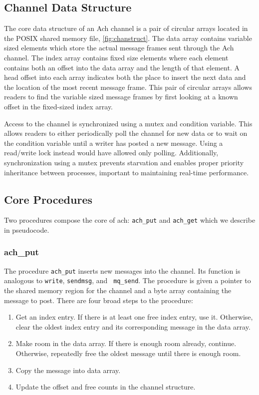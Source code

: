 \documentclass[letterpaper]{IEEEtran}
\begin{document}
\subsection{Channel Data Structure}

The core data structure of an Ach channel is a pair of circular arrays
located in the POSIX shared memory file, \autoref{fig:chanstruct}.  The
data array contains variable sized elements which store the actual
message frames sent through the Ach channel.  The index array contains
fixed size elements where each element contains both an offset into
the data array and the length of that element.  A head offset into
each array indicates both the place to insert the next data and the
location of the most recent message frame.  This pair of circular
arrays allows readers to find the variable sized message frames by
first looking at a known offset in the fixed-sized index array.

Access to the channel is synchronized using a mutex and condition
variable.  This allows readers to either periodically poll the channel
for new data or to wait on the condition variable until a writer has
posted a new message.  Using a read/write lock instead would have
allowed only polling.  Additionally, synchronization using a mutex
prevents starvation and enables proper priority inheritance between
processes, important to maintaining real-time performance.



\subsection{Core Procedures}
Two procedures compose the core of ach: {\tt ach\_put} and {\tt ach\_get} which we describe in pseudocode.
\vspace{+5pt}
\noindent \subsubsection{ach\_put}
The procedure {\tt ach\_put} inserts new messages into the channel.
Its function is analogous to {\tt write}, {\tt sendmsg}, and {\tt
  mq\_send}.  The procedure is given a pointer to the shared memory
region for the channel and a byte array containing the message to
post.  There are four broad steps to the procedure:

{\small
\begin{enumerate}[(1)]
\item Get an index entry.  If there is at least one free index entry,
  use it.  Otherwise, clear the oldest index entry and its
  corresponding message in the data array.
\item Make room in the data array.  If there is enough room already,
  continue.  Otherwise, repeatedly free the oldest message until there
  is enough room.
\item Copy the message into data array.
\item Update the offset and free counts in the channel structure.
\end{enumerate}}
\end{document}
